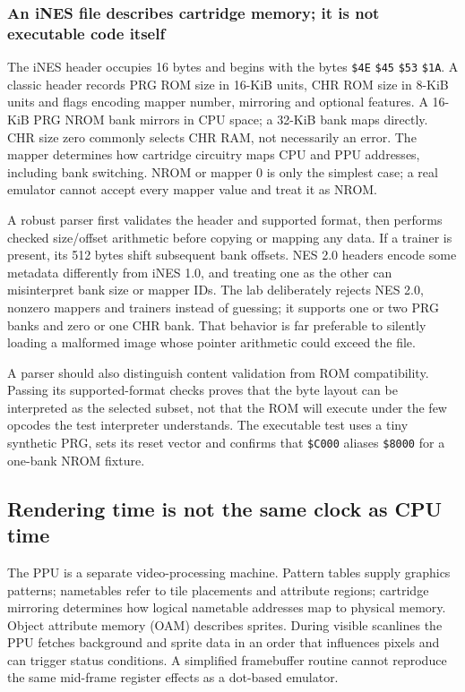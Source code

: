 \subsubsection{An iNES file describes cartridge memory; it is not executable code itself}\label{an-ines-file-describes-cartridge-memory-it-is-not-executable-code-itself}

The iNES header occupies 16 bytes and begins with the bytes \texttt{\$4E} \texttt{\$45} \texttt{\$53} \texttt{\$1A}. A classic header records PRG ROM size in 16-KiB units, CHR ROM size in 8-KiB units and flags encoding mapper number, mirroring and optional features. A 16-KiB PRG NROM bank mirrors in CPU space; a 32-KiB bank maps directly. CHR size zero commonly selects CHR RAM, not necessarily an error. The mapper determines how cartridge circuitry maps CPU and PPU addresses, including bank switching. NROM or mapper 0 is only the simplest case; a real emulator cannot accept every mapper value and treat it as NROM.

A robust parser first validates the header and supported format, then performs checked size/offset arithmetic before copying or mapping any data. If a trainer is present, its 512 bytes shift subsequent bank offsets. NES 2.0 headers encode some metadata differently from iNES 1.0, and treating one as the other can misinterpret bank size or mapper IDs. The lab deliberately rejects NES 2.0, nonzero mappers and trainers instead of guessing; it supports one or two PRG banks and zero or one CHR bank. That behavior is far preferable to silently loading a malformed image whose pointer arithmetic could exceed the file.

A parser should also distinguish content validation from ROM compatibility. Passing its supported-format checks proves that the byte layout can be interpreted as the selected subset, not that the ROM will execute under the few opcodes the test interpreter understands. The executable test uses a tiny synthetic PRG, sets its reset vector and confirms that \texttt{\$C000} aliases \texttt{\$8000} for a one-bank NROM fixture.

\subsection{Rendering time is not the same clock as CPU time}\label{rendering-time-is-not-the-same-clock-as-cpu-time}

The PPU is a separate video-processing machine. Pattern tables supply graphics patterns; nametables refer to tile placements and attribute regions; cartridge mirroring determines how logical nametable addresses map to physical memory. Object attribute memory (OAM) describes sprites. During visible scanlines the PPU fetches background and sprite data in an order that influences pixels and can trigger status conditions. A simplified framebuffer routine cannot reproduce the same mid-frame register effects as a dot-based emulator.

